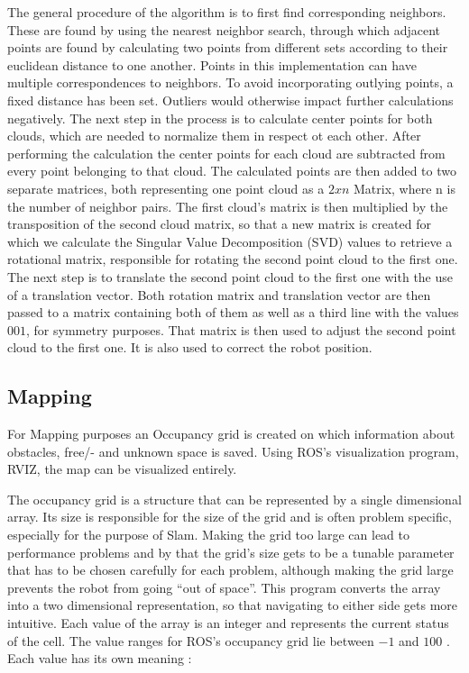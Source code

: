 \documentclass{ba-kecs}
\begin{document}
The general procedure of the algorithm is to first find corresponding neighbors. These are found by using the nearest neighbor search, through which adjacent points are found by calculating two points from different sets according to their euclidean distance to one another. Points in this implementation can have multiple correspondences to neighbors. To avoid incorporating outlying points, a fixed distance has been set. Outliers would otherwise impact further calculations negatively.
The next step in the process is to calculate center points for both clouds, which are needed to normalize them in respect ot each other. After performing the calculation the center points for each cloud are subtracted from every point belonging to that cloud. The calculated points are then added to two separate matrices, both representing one point cloud as a $2xn$ Matrix, where n is the number of neighbor pairs. The first cloud's matrix is then multiplied by the transposition of the second cloud matrix, so that a new matrix is created for which we calculate the Singular Value Decomposition (SVD) values to retrieve a rotational matrix, responsible for rotating the second point cloud to the first one. The next step is to translate the second point cloud to the first one with the use of a translation vector. Both rotation matrix and translation vector are then passed to a matrix containing both of them as well as a third line with the values $0 0 1$, for symmetry purposes. That matrix is then used to adjust the second point cloud to the first one. It is also used to correct the robot position.

\subsection{Mapping}\label{sec:mapping}

For Mapping purposes an Occupancy grid is created on which information about obstacles, free/- and unknown space is saved. Using ROS's visualization program, RVIZ, the map can be visualized entirely.

The occupancy grid is a structure that can be represented by a single dimensional array. Its size is responsible for the size of the grid and is often problem specific, especially for the purpose of Slam. Making the grid too large can lead to performance problems and by that the grid's size gets to be a tunable parameter that has to be chosen carefully for each problem, although making the grid large prevents the robot from going ``out of space''.
 This program converts the array into a two dimensional representation, so that navigating to either side gets more intuitive. Each value of the array is an integer and represents the current status of the cell. The value ranges for ROS's occupancy grid lie between $-1$ and $100$ \cite{occupancy}. Each value has its own meaning :
\end{document}
